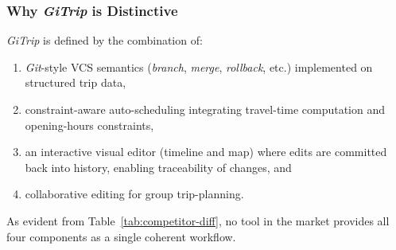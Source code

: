 \subsubsection{Why \textit{GiTrip} is Distinctive}
\label{sec:uniqueness}
\textit{GiTrip} is defined by the combination of:
\begin{enumerate}[label=\alph*)]
    \item \textit{Git}-style VCS semantics (\textit{branch}, \textit{merge}, \textit{rollback}, etc.) implemented on structured trip data,
    \item constraint-aware auto-scheduling integrating travel-time computation and opening-hours constraints,
    \item an interactive visual editor (timeline and map) where edits are committed back into history, enabling traceability of changes, and 
    \item collaborative editing for group trip-planning.
\end{enumerate}
As evident from Table~\ref{tab:competitor-diff}, no tool in the market provides all four components as a single coherent workflow.


